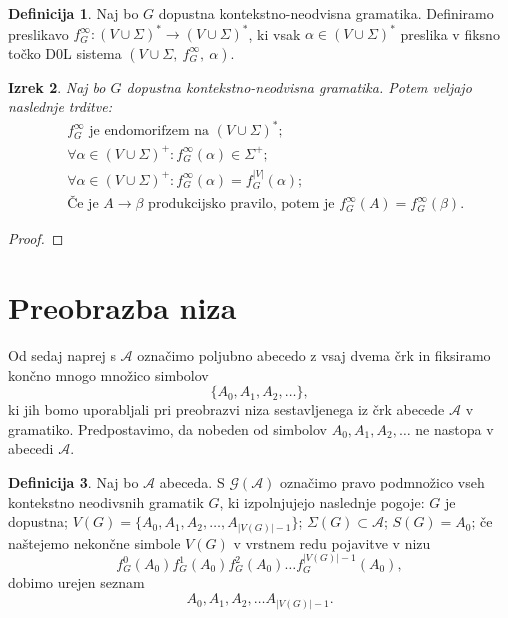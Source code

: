 \documentclass{amsart}
\newcommand{\G}{\mathcal{G}}
\newcommand{\A}{\mathcal{A}}
\theoremstyle{definition}
\newtheorem{definicija}{Definicija}[section]
\theoremstyle{plain} %
\newtheorem{izrek}[definicija]{Izrek}
\begin{document}
\begin{definicija}

    Naj bo $G$ dopustna kontekstno-neodvisna gramatika. Definiramo preslikavo
    $ f_G^\infty \colon (V \cup \Sigma)^* \to (V \cup \Sigma)^* $, ki vsak 
    $ \alpha \in (V \cup \Sigma)^* $ preslika v fiksno točko D0L sistema $ (V \cup \Sigma, \ f_G^\infty, \ \alpha) $.
    
\end{definicija}

\begin{izrek}

    Naj bo $G$ dopustna kontekstno-neodvisna gramatika. Potem veljajo naslednje trditve:
    \begin{align}
        & f_G^\infty \text{ je endomorifzem na } (V \cup \Sigma)^*; \\
        & \forall \alpha \in (V \cup \Sigma)^+ \colon f_G^\infty(\alpha) \in \Sigma^+; \\
        & \forall \alpha \in (V \cup \Sigma)^+ \colon f_G^\infty(\alpha) = f_G^{|V|}(\alpha); \\
        &\text{Če je } A \rightarrow \beta \text{ produkcijsko pravilo, potem je } f_G^\infty(A) = f_G^\infty(\beta).
    \end{align}
    
\end{izrek}

\setcounter{equation}{0}

\begin{proof}
    
\end{proof}

\section{Preobrazba niza}

Od sedaj naprej s $\A$ označimo poljubno abecedo z vsaj dvema črk
in fiksiramo končno mnogo množico simbolov
\[
    \{A_0, A_1, A_2, \ldots \},
\]
ki jih bomo uporabljali pri preobrazvi niza sestavljenega
iz črk abecede $\A$ v gramatiko. Predpostavimo, da nobeden
od simbolov $ A_0, A_1, A_2, \ldots $ ne nastopa v abecedi $\A$.

\begin{definicija}
    
    Naj bo $\A$ abeceda. S $ \G(\A) $ označimo pravo podmnožico vseh kontekstno neodivsnih gramatik
    $G$, ki izpolnjujejo naslednje pogoje: $G$ je dopustna; $ V(G) = \{ A_0, A_1, A_2, \ldots, A_{|V(G)| - 1} \} $; $ \Sigma(G) \subset \A $; $ S(G) = A_0 $; če naštejemo nekončne simbole $V(G)$ v vrstnem redu pojavitve v nizu
    \[
        f_G^0(A_0) f_G^1(A_0) f_G^2(A_0) \dots f_G^{|V(G)| - 1}(A_0),
    \]
    dobimo urejen seznam
    \[
        A_0, A_1, A_2, \ldots A_{|V(G)| - 1}.
    \]
    
\end{definicija}
\end{document}
